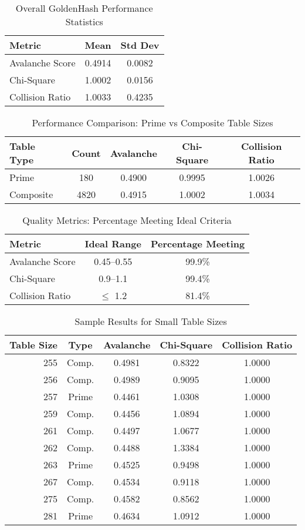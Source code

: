 
\begin{table}[h]
\centering
\caption{Overall GoldenHash Performance Statistics}
\begin{tabular}{lcc}
\hline
Metric & Mean & Std Dev \\
\hline
Avalanche Score & 0.4914 & 0.0082 \\
Chi-Square & 1.0002 & 0.0156 \\
Collision Ratio & 1.0033 & 0.4235 \\
\hline
\end{tabular}
\end{table}

\begin{table}[h]
\centering
\caption{Performance Comparison: Prime vs Composite Table Sizes}
\begin{tabular}{lcccc}
\hline
Table Type & Count & Avalanche & Chi-Square & Collision Ratio \\
\hline
Prime & 180 & 0.4900 & 0.9995 & 1.0026 \\
Composite & 4820 & 0.4915 & 1.0002 & 1.0034 \\
\hline
\end{tabular}
\end{table}

\begin{table}[h]
\centering
\caption{Quality Metrics: Percentage Meeting Ideal Criteria}
\begin{tabular}{lcc}
\hline
Metric & Ideal Range & Percentage Meeting \\
\hline
Avalanche Score & 0.45--0.55 & 99.9\% \\
Chi-Square & 0.9--1.1 & 99.4\% \\
Collision Ratio & $\leq$ 1.2 & 81.4\% \\
\hline
\end{tabular}
\end{table}

\begin{table}[h]
\centering
\caption{Sample Results for Small Table Sizes}
\begin{tabular}{rcccc}
\hline
Table Size & Type & Avalanche & Chi-Square & Collision Ratio \\
\hline
255 & Comp. & 0.4981 & 0.8322 & 1.0000 \\
256 & Comp. & 0.4989 & 0.9095 & 1.0000 \\
257 & Prime & 0.4461 & 1.0308 & 1.0000 \\
259 & Comp. & 0.4456 & 1.0894 & 1.0000 \\
261 & Comp. & 0.4497 & 1.0677 & 1.0000 \\
262 & Comp. & 0.4488 & 1.3384 & 1.0000 \\
263 & Prime & 0.4525 & 0.9498 & 1.0000 \\
267 & Comp. & 0.4534 & 0.9118 & 1.0000 \\
275 & Comp. & 0.4582 & 0.8562 & 1.0000 \\
281 & Prime & 0.4634 & 1.0912 & 1.0000 \\
\hline
\end{tabular}
\end{table}
